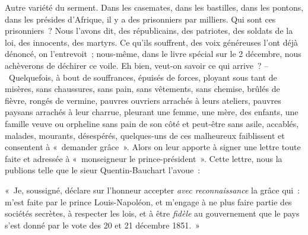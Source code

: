 \documentclass[french,twoside]{book} %
\newenvironment{quoteblock}%
  {\begin{quoting}}
  {\end{quoting}}
\newenvironment{quotebar}{%
    \def\FrameCommand{{\color{rubric!10!}\vrule width 0.5em} \hspace{0.9em}}%
    \def\OuterFrameSep{\itemsep} %
    \MakeFramed {\advance\hsize-\width \FrameRestore}
  }%
  {%
    \endMakeFramed
  }
\renewenvironment{quoteblock}%
  {%
    \savenotes
    \setstretch{0.9}
    \normalfont
    \begin{quotebar}
  }
  {%
    \end{quotebar}
    \spewnotes
  }
\begin{document}
Autre variété du serment. Dans les casemates, dans les bastilles, dans les pontons, dans les présides d’Afrique, il y a des prisonniers par milliers. Qui sont ces prisonniers ? Nous l’avons dit, des républicains, des patriotes, des soldats de la loi, des innocents, des martyrs. Ce qu’ils souffrent, des voix généreuses l’ont déjà dénoncé, on l’entrevoit ; nous-même, dans le livre spécial sur le 2 décembre, nous achèverons de déchirer ce voile. Eh bien, veut-on savoir ce qui arrive ? – Quelquefois, à bout de souffrances, épuisés de forces, ployant sous tant de misères, sans chaussures, sans pain, sans vêtements, sans chemise, brûlés de fièvre, rongés de vermine, pauvres ouvriers arrachés à leurs ateliers, pauvres paysans arrachés à leur charrue, pleurant une femme, une mère, des enfants, une famille veuve ou orpheline sans pain de son côté et peut-être sans asile, accablés, malades, mourants, désespérés, quelques-uns de ces malheureux faiblissent et consentent à « demander grâce ». Alors on leur apporte à signer une lettre toute faite et adressée à « monseigneur le prince-président ». Cette lettre, nous la publions telle que le sieur Quentin-Bauchart l’avoue :\par

\begin{quoteblock}
 \noindent « Je, soussigné, déclare sur l’honneur accepter \emph{avec reconnaissance} la grâce qui : m’est faite par le prince Louis-Napoléon, et m’engage à ne plus faire partie des sociétés secrètes, à respecter les lois, et à être \emph{fidèle} au gouvernement que le pays s’est donné par le vote des 20 et 21 décembre 1851. »
 \end{quoteblock}
\end{document}
